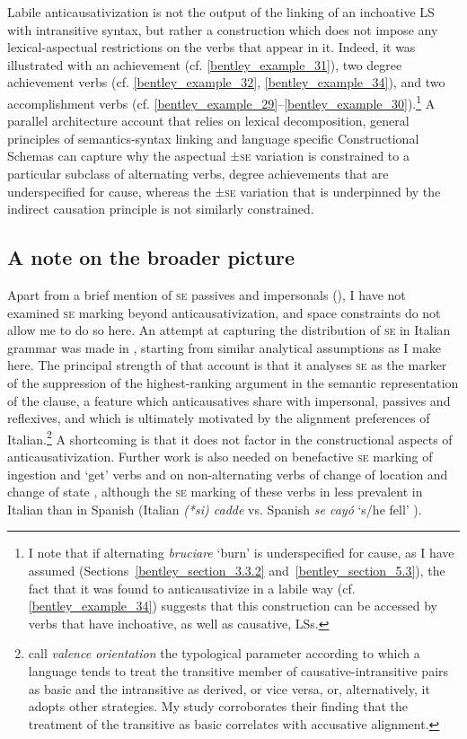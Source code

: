 \documentclass[output=paper,colorlinks,citecolor=brown
]{langscibook}
\begin{document}
Labile anticausativization is not the output of the linking of an inchoative LS with intransitive syntax, but rather a construction which does not impose any lexical-aspectual restrictions on the verbs that appear in it. Indeed, it was illustrated with an achievement (cf. \ref{bentley_example_31}), two degree achievement verbs (cf. \ref{bentley_example_32}, \ref{bentley_example_34}), and two accomplishment verbs (cf. \ref{bentley_example_29}--\ref{bentley_example_30}).\footnote{I note that if alternating \textit{bruciare} ‘burn’ is underspecified for cause, as I have assumed (Sections~\ref{bentley_section_3.3.2} and~\ref{bentley_section_5.3}), the fact that it was found to anticausativize in a labile way (cf. \ref{bentley_example_34}) suggests that this construction can be accessed by verbs that have inchoative, as well as causative, LSs.}  A parallel architecture account that relies on lexical decomposition, general principles of semantics-syntax linking and language specific Constructional Schemas can capture why the aspectual ±\textsc{se} variation is constrained to a particular subclass of alternating verbs, degree achievements that are underspecified for cause, whereas the ±\textsc{se} variation that is underpinned by the indirect causation principle is not similarly constrained.  

\subsection{A note on the broader picture}
\label{bentley_section_5.5}

Apart from a brief mention of \textsc{se} passives and impersonals (), I have not examined \textsc{se} marking beyond anticausativization, and space constraints do not allow me to do so here. An attempt at capturing the distribution of \textsc{se} in Italian grammar was made in \citet{bentley2006split}, starting from similar analytical assumptions as I make here. The principal strength of that account is that it analyses \textsc{se} as the marker of the suppression of the highest-ranking argument in the semantic representation of the clause, a feature which anticausatives share with impersonal, passives and reflexives, and which is ultimately motivated by the alignment preferences of Italian.\footnote{\citet{nichols2004transitivizing} call \textit{valence orientation} the typological parameter according to which a language tends to treat the transitive member of causative-intransitive pairs as basic and the intransitive as derived, or vice versa, or, alternatively, it adopts other strategies. My study corroborates their finding that the treatment of the transitive as basic correlates with accusative alignment.}  A shortcoming is that it does not factor in the constructional aspects of anticausativization. Further work is also needed on benefactive \textsc{se} marking of ingestion and ‘get’ verbs \citep[153--154]{bentley2006split} and on non-alternating verbs of change of location and change of state \citep{miguel2000operador,gonzales2006construcciones,jimenez2017causativity}, although the \textsc{se} marking of these verbs in less prevalent in Italian than in Spanish (Italian \textit{(*si) cadde} vs. Spanish \textit{se cayó} ‘s/he fell’ ). 
\end{document}
